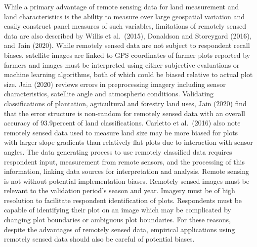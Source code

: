 \documentclass[
]{book}
\begin{document}
While a primary advantage of remote sensing data for land measurement and land characteristics is the ability to measure over large geospatial variation and easily construct panel measures of such variables, limitations of remotely sensed data are also described by Willis et al.~(2015), Donaldson and Storeygard (2016), and Jain (2020). While remotely sensed data are not subject to respondent recall biases, satellite images are linked to GPS coordinates of farmer plots reported by farmers and images must be interpreted using either subjective evaluations or machine learning algorithms, both of which could be biased relative to actual plot size. Jain (2020) reviews errors in preprocessing imagery including sensor characteristics, satellite angle and atmospheric conditions. Validating classifications of plantation, agricultural and forestry land uses, Jain (2020) find that the error structure is non-random for remotely sensed data with an overall accuracy of 93.9percent of land classifications. Carletto et al.~(2016) also note remotely sensed data used to measure land size may be more biased for plots with larger slope gradients than relatively flat plots due to interaction with sensor angles. The data generating process to use remotely classified data requires respondent input, measurement from remote sensors, and the processing of this information, linking data sources for interpretation and analysis. Remote sensing is not without potential implementation biases. Remotely sensed images must be relevant to the validation period's season and year. Imagery must be of high resolution to facilitate respondent identification of plots. Respondents must be capable of identifying their plot on an image which may be complicated by changing plot boundaries or ambiguous plot boundaries. For these reasons, despite the advantages of remotely sensed data, empirical applications using remotely sensed data should also be careful of potential biases.
\end{document}
